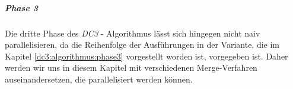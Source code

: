 \subparagraph*{Phase 3}

Die dritte Phase des \emph{DC3} - Algorithmus lässt sich hingegen nicht naiv parallelisieren, da die Reihenfolge der Ausführungen in der Variante, die im Kapitel \ref{dc3:algorithmus:phase3} vorgestellt worden ist, vorgegeben ist.
Daher werden wir uns in diesem Kapitel mit verschiedenen Merge-Verfahren auseinandersetzen, die parallelisiert werden können.






